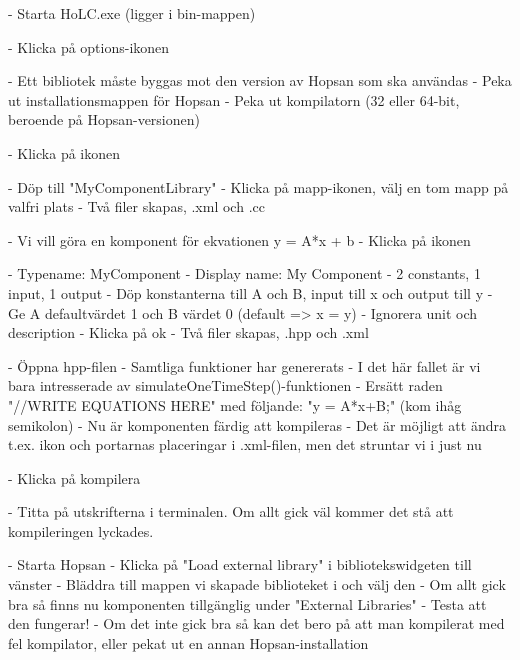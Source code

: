 \documentclass[a4paper,pdftex]{article}
\begin{document}
\begin{tutenumerate}
- Starta HoLC.exe (ligger i bin-mappen)

- Klicka på options-ikonen


- Ett bibliotek måste byggas mot den version av Hopsan som ska användas
- Peka ut installationsmappen för Hopsan
- Peka ut kompilatorn (32 eller 64-bit, beroende på Hopsan-versionen)

- Klicka på ikonen


- Döp till "MyComponentLibrary"
- Klicka på mapp-ikonen, välj en tom mapp på valfri plats
- Två filer skapas, .xml och .cc

- Vi vill göra en komponent för ekvationen y = A*x + b
- Klicka på ikonen


- Typename: MyComponent
- Display name: My Component
- 2 constants, 1 input, 1 output
- Döp konstanterna till A och B, input till x och output till y
- Ge A defaultvärdet 1 och B värdet 0 (default => x = y)
- Ignorera unit och description 
- Klicka på ok
- Två filer skapas, .hpp och .xml

- Öppna hpp-filen
- Samtliga funktioner har genererats
- I det här fallet är vi bara intresserade av simulateOneTimeStep()-funktionen
- Ersätt raden "//WRITE EQUATIONS HERE" med följande: "y = A*x+B;" (kom ihåg semikolon)
- Nu är komponenten färdig att kompileras
- Det är möjligt att ändra t.ex. ikon och portarnas placeringar i .xml-filen, men det struntar vi i just nu

- Klicka på kompilera


- Titta på utskrifterna i terminalen. Om allt gick väl kommer det stå att kompileringen lyckades.

- Starta Hopsan
- Klicka på "Load external library" i bibliotekswidgeten till vänster
- Bläddra till mappen vi skapade biblioteket i och välj den
- Om allt gick bra så finns nu komponenten tillgänglig under "External Libraries"
- Testa att den fungerar!
- Om det inte gick bra så kan det bero på att man kompilerat med fel kompilator, eller pekat ut en annan Hopsan-installation

\end{tutenumerate}
 	
\end{document}
